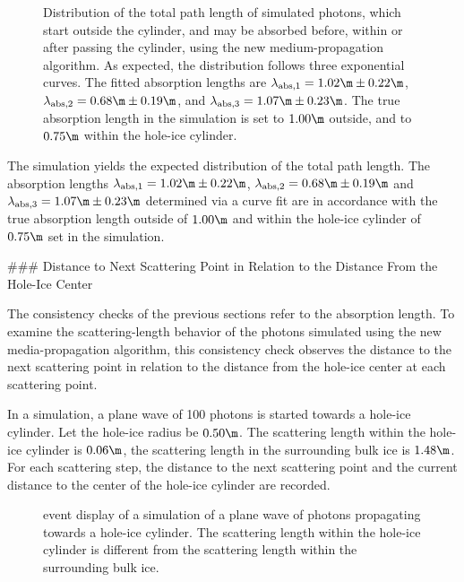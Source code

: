 \begin{figure}
  \caption{Distribution of the total path length of simulated photons, which start outside the cylinder, and may be absorbed before, within or after passing the cylinder, using the new medium-propagation algorithm. As expected, the distribution follows three exponential curves. The fitted absorption lengths are $\lambda_\text{abs,1} = 1.02\m \pm 0.22\m$, $\lambda_\text{abs,2} = 0.68\m \pm 0.19\m$, and $\lambda_\text{abs,3} = 1.07\m \pm 0.23\m$. The true absorption length in the simulation is set to $1.00\m$ outside, and to $0.75\m$ within the hole-ice cylinder.}
\end{figure}

The simulation yields the expected distribution of the total path length. The absorption lengths $\lambda_\text{abs,1} = 1.02\m \pm 0.22\m$, $\lambda_\text{abs,2} = 0.68\m \pm 0.19\m$ and $\lambda_\text{abs,3} = 1.07\m \pm 0.23\m$ determined via a curve fit are in accordance with the true absorption length outside of $1.00\m$ and within the hole-ice cylinder of $0.75\m$ set in the simulation.


### Distance to Next Scattering Point in Relation to the Distance From the Hole-Ice Center
\label{sec:cross_check_71}


The consistency checks of the previous sections refer to the absorption length. To examine the scattering-length behavior of the photons simulated using the new media-propagation algorithm, this consistency check observes the distance to the next scattering point in relation to the distance from the hole-ice center at each scattering point.

In a simulation, a plane wave of 100 photons is started towards a hole-ice cylinder. Let the hole-ice radius be $0.50\m$. The scattering length within the hole-ice cylinder is $0.06\m$, the scattering length in the surrounding bulk ice is $1.48\m$.
For each scattering step, the distance to the next scattering point and the current distance to the center of the hole-ice cylinder are recorded.


\begin{figure}[htbp]
  \caption{\steamshovel event display of a simulation of a plane wave of photons propagating towards a hole-ice cylinder. The scattering length within the hole-ice cylinder is different from the scattering length within the surrounding bulk ice.}
  \label{fig:An7ik8pu}
\end{figure}

